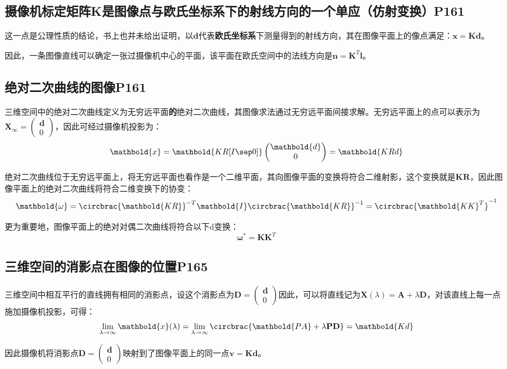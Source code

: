 \documentclass[11pt]{article}
\begin{document}
\subsection{摄像机标定矩阵K是图像点与欧氏坐标系下的射线方向的一个单应（仿射变换）P161}
这一点是公理性质的结论，书上也并未给出证明，以$\mathbold{d}$代表\textbf{欧氏坐标系}下测量得到的射线方向，其在图像平面上的像点满足：$\mathbold{x=Kd}$。\par
因此，一条图像直线可以确定一张过摄像机中心的平面，该平面在欧氏空间中的法线方向是$\mathbold{n=K}^T\mathbold{l}$。\par
\subsection{绝对二次曲线的图像P161}
三维空间中的绝对二次曲线定义为无穷远平面\textbf{的}绝对二次曲线，其图像求法通过无穷远平面间接求解。无穷远平面上的点可以表示为$\mathbold{X}_\infty=\begin{pmatrix}
    \mathbold{d} \\ 0
  \end{pmatrix}$，因此可经过摄像机投影为：
\begin{equation*}
  \mathbold{x}=\mathbold{KR[I\sep 0]}\begin{pmatrix}
    \mathbold{d} \\ 0
  \end{pmatrix}=\mathbold{KRd}
\end{equation*}\par
绝对二次曲线位于无穷远平面上，将无穷远平面也看作是一个二维平面，其向图像平面的变换将符合二维射影，这个变换就是$\mathbold{KR}$，因此图像平面上的绝对二次曲线将符合二维变换下的协变：
\begin{equation*}
  \mathbold{\omega}=\circbrac{\mathbold{KR}}^{-T}\mathbold{I}\circbrac{\mathbold{KR}}^{-1}=\circbrac{\mathbold{KK}^T}^{-1}
\end{equation*}\par
更为重要地，图像平面上的绝对对偶二次曲线将符合以下d变换：
\begin{equation*}
  \mathbold{\omega}^*=\mathbold{KK}^T
\end{equation*}\par
\subsection{三维空间的消影点在图像的位置P165}
三维空间中相互平行的直线拥有相同的消影点，设这个消影点为$\mathbf{D}=\begin{pmatrix}
    \mathbold{d} \\ 0
  \end{pmatrix}$因此，可以将直线记为$\mathbold{X}(\lambda)=\mathbold{A}+\lambda\mathbf{D}$，对该直线上每一点施加摄像机投影，可得：
\begin{equation*}
  \lim_{\lambda\to\infty}\mathbold{x}(\lambda)=\lim_{\lambda\to\infty}\circbrac{\mathbold{PA}+\lambda\mathbf{PD}}=\mathbold{Kd}
\end{equation*}\par
因此摄像机将消影点$\mathbf{D}=\begin{pmatrix}
    \mathbold{d} \\ 0
  \end{pmatrix}$映射到了图像平面上的同一点$\mathbold{v=Kd}$。
\end{document}
